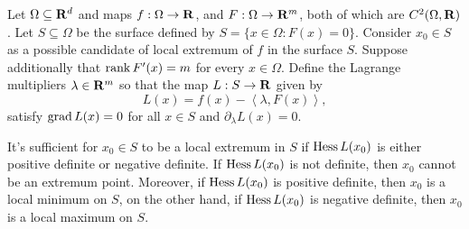 \begin{theorem}
    \label{thm:sufficient-extremum}
    Let \(\Omega \subseteq \mathbf{R}^d\) and maps \(f: \Omega \to \mathbf{R}\), and  \(F: \Omega \to \mathbf{R}^m\), both of which
    are \(C^2(\Omega, \mathbf{R})\). Let \(S \subseteq \Omega\) be the surface defined by \(S = \{x \in \Omega \colon
    F(x) = 0\}\). Consider \(x_0 \in S\) as a possible candidate of local extremum
    of \(f\) in the surface \(S\). Suppose additionally that \(\operatorname{rank} F'(x) =
    m\) for every \(x \in \Omega\). Define the Lagrange multipliers \(\lambda \in \mathbf{R}^m\) so that
    the map \(L: S \to \mathbf{R}\) given by
    \[
        L(x) = f(x) - \left\langle \lambda, F(x) \right\rangle,
    \]
    satisfy \(\operatorname{grad} L(x) = 0\) for all \(x \in S\) and \(\partial_{\lambda} L(x) = 0\).

    It's sufficient for \(x_0 \in S\) to be a local extremum in \(S\) if \(\operatorname{Hess}
    L(x_0)\) is either positive definite or negative definite. If \(\operatorname{Hess} L(x_0)\)
    is not definite, then \(x_0\) cannot be an extremum point. Moreover, if \(\operatorname{Hess}
    L(x_0)\) is positive definite, then \(x_0\) is a local minimum on \(S\), on the
    other hand, if \(\operatorname{Hess} L(x_0)\) is negative definite, then \(x_0\) is a local
    maximum on \(S\).
\end{theorem}


